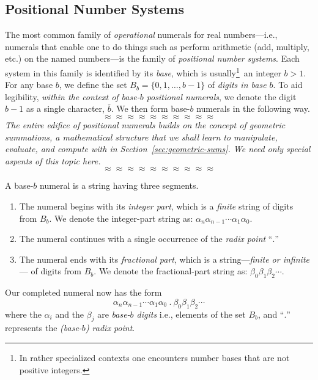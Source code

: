 \subsection{Positional Number Systems}
\label{sec:positional-numbers}

The most common family of {\em operational}
 numerals for real numbers---i.e.,
numerals that enable one to do things such as perform arithmetic (add,
multiply, etc.) on the named numbers---is the family of {\it
  positional number systems}.  Each system in this family is
identified by its {\em base}, 
which is usually\footnote{In rather specialized contexts one
  encounters number bases that are not positive integers.}~an
integer $b >1$.
For any base $b$, we define the set $B_b = \{ 0, 1, \ldots, b-1\}$ of
{\it digits in base $b$}.
%
To aid legibility, {\em within the context of base-$b$ positional
  numerals}, we denote the digit $b-1$ as a single character, $\bar{b}$.
%
We then form base-$b$ numerals in the following way.
\[ \approx \approx \approx \approx \approx \approx \approx \approx \approx \approx \]
{\em The entire edifice of positional numerals builds on the concept
  of {\em geometric summations}, a mathematical structure that we
  shall learn to manipulate, evaluate, and compute with in
  Section~\ref{sec:geometric-sums}.  We need only special aspents of
  this topic here.
}
\[ \approx \approx \approx \approx \approx \approx \approx \approx \approx \approx \]

A base-$b$ numeral is a string having three segments.
\begin{enumerate}
\item
The numeral begins with its {\em integer part},
%
which is a {\em finite} string of digits from $B_b$.  We denote the
integer-part string as: $\alpha_n \alpha_{n-1} \cdots \alpha_1
\alpha_0$.

\item
The numeral continues with a single occurrence of the {\it
  radix point}
``$.$''

\item
The numeral ends with its {\em fractional part},
%
which is a string---{\em finite or infinite}--- of digits from $B_b$.
We denote the fractional-part string as:
$\beta_0 \beta_1 \beta_2 \cdots$.
\end{enumerate}
Our completed numeral now has the form
\begin{equation}
\label{eq:real-numeral}
\alpha_n \alpha_{n-1} \cdots \alpha_1 \alpha_0
\ . \ \beta_0 \beta_1 \beta_2 \cdots
\end{equation}
where the $\alpha_i$ and the $\beta_j$
are {\em base-$b$ digits} i.e., elements of the set $B_b$, and
``$.$'' represents the {\em (base-$b$) radix point}.

